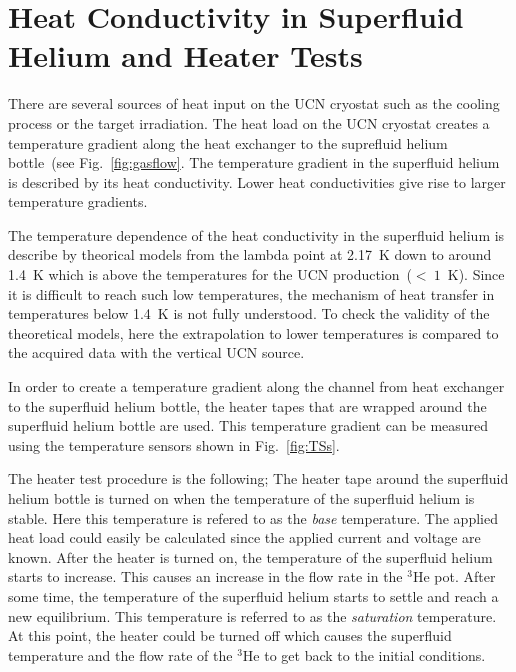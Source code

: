 \chapter{Heat Conductivity in Superfluid Helium and Heater Tests~\label{sec:heattest}~\cite{Florian_thesis}}


There are several sources of heat input on the UCN cryostat such as
the cooling process or the target irradiation. The heat load on the
UCN cryostat creates a temperature gradient along the heat exchanger
to the suprefluid helium bottle~(see Fig.~\ref{fig:gasflow}. The
temperature gradient in the superfluid helium is described by its heat
conductivity. Lower heat conductivities give rise to larger
temperature gradients.

The temperature dependence of the heat conductivity in the superfluid
helium is describe by theorical models from the lambda point at 2.17~K
down to around 1.4~K which is above the temperatures for the UCN
production~($<~1$~K). Since it is difficult to reach such low
temperatures, the mechanism of heat transfer in temperatures below
1.4~K is not fully understood.  To check the validity of the
theoretical models, here the extrapolation to lower temperatures is
compared to the acquired data with the vertical UCN source.


In order to create a temperature gradient along the channel from heat
exchanger to the superfluid helium bottle, the heater tapes that are
wrapped around the superfluid helium bottle are used.
This temperature gradient can be measured using the temperature
sensors shown in Fig.~\ref{fig:TSs}.

The heater test procedure is the following; The heater tape around the
superfluid helium bottle is turned on when the temperature of the
superfluid helium is stable. Here this temperature is refered to as
the {\it{base}} temperature. The applied heat load could easily be
calculated since the applied current and voltage are known. After the
heater is turned on, the temperature of the superfluid helium starts
to increase. This causes an increase in the flow rate in the $^3$He
pot. After some time, the temperature of the superfluid helium starts
to settle and reach a new equilibrium. This temperature is referred to
as the {\it{saturation}} temperature. At this point, the heater could
be turned off which causes the superfluid temperature and the flow
rate of the $^3$He to get back to the initial conditions.


